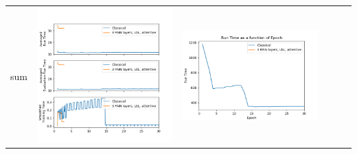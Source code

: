 \begin{longtable}[]{@{}llllll@{}}
sum & \includegraphics{sum_time.png} & \includegraphics{sum_epoch.png} &

\end{longtable}
